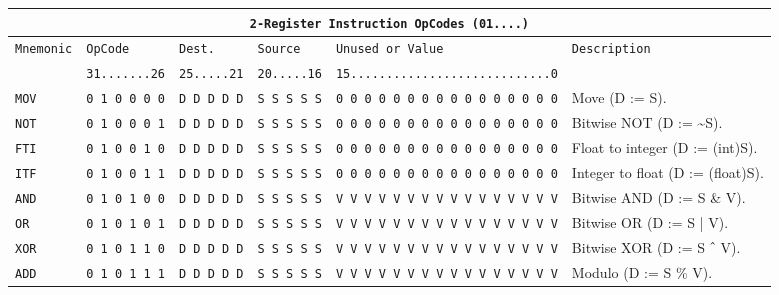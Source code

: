 \documentclass{report}
\begin{document}
{\footnotesize
\begin{center}
\begin{tabular}[ht]{
	| p{} | p{} | p{} | p{}
	| p{} | p{} |
}
	\hline
	\multicolumn{6}{|c|}{\texttt{2-Register Instruction OpCodes (01....)}} \\
	\hline \hline
	
	\multirow{2}{*}{\texttt{Mnemonic}} & \texttt{OpCode} & \texttt{Dest.} & \texttt{Source} &
		\texttt{Unused or Value} & \multirow{2}{*}{\texttt{Description}} \\
	& \texttt{31.......26} & \texttt{25.....21} & \texttt{20.....16} & \texttt{15............................0} & \\
	\hline
	
	\texttt{MOV} & \texttt{0 1 0 0 0 0} & \texttt{D D D D D} & \texttt{S S S S S} &
		\texttt{0 0 0 0 0 0 0 0 0 0 0 0 0 0 0 0} & Move (D := S). \\
	\hline
	
	\texttt{NOT} & \texttt{0 1 0 0 0 1} & \texttt{D D D D D} & \texttt{S S S S S} &
		\texttt{0 0 0 0 0 0 0 0 0 0 0 0 0 0 0 0} & Bitwise NOT (D := \textasciitilde S). \\
	\hline
	
	\texttt{FTI} & \texttt{0 1 0 0 1 0} & \texttt{D D D D D} & \texttt{S S S S S} &
		\texttt{0 0 0 0 0 0 0 0 0 0 0 0 0 0 0 0} & Float to integer (D := (int)S). \\
	\hline
	
	\texttt{ITF} & \texttt{0 1 0 0 1 1} & \texttt{D D D D D} & \texttt{S S S S S} &
		\texttt{0 0 0 0 0 0 0 0 0 0 0 0 0 0 0 0} & Integer to float (D := (float)S). \\
	\hline
	
	\texttt{AND} & \texttt{0 1 0 1 0 0} & \texttt{D D D D D} & \texttt{S S S S S} &
		\texttt{V V V V V V V V V V V V V V V V} & Bitwise AND (D := S \& V). \\
	\hline
	
	\texttt{OR} & \texttt{0 1 0 1 0 1} & \texttt{D D D D D} & \texttt{S S S S S} &
		\texttt{V V V V V V V V V V V V V V V V} & Bitwise OR (D := S | V). \\
	\hline
	
	\texttt{XOR} & \texttt{0 1 0 1 1 0} & \texttt{D D D D D} & \texttt{S S S S S} &
		\texttt{V V V V V V V V V V V V V V V V} & Bitwise XOR (D := S ${\mathchar"5E}$ V). \\
	\hline
	
	\texttt{ADD} & \texttt{0 1 0 1 1 1} & \texttt{D D D D D} & \texttt{S S S S S} &
		\texttt{V V V V V V V V V V V V V V V V} & Modulo (D := S \% V). \\
	\hline
	

\end{tabular}
\end{center}}
\end{document}
